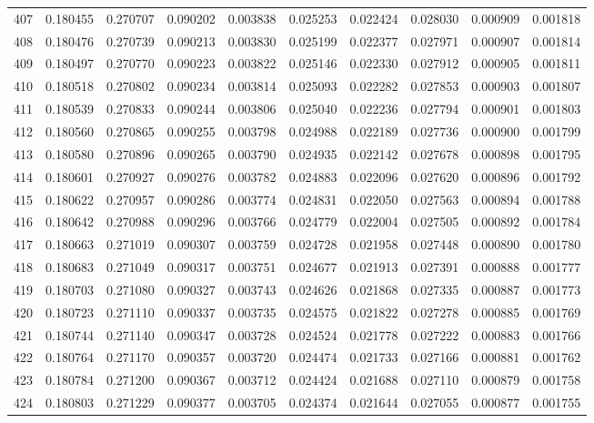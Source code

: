 \begin{tabular}{lrrrrrrrrr}
407 & 0.180455 & 0.270707 & 0.090202 & 0.003838 & 0.025253 & 0.022424 & 0.028030 & 0.000909 & 0.001818 \\
408 & 0.180476 & 0.270739 & 0.090213 & 0.003830 & 0.025199 & 0.022377 & 0.027971 & 0.000907 & 0.001814 \\
409 & 0.180497 & 0.270770 & 0.090223 & 0.003822 & 0.025146 & 0.022330 & 0.027912 & 0.000905 & 0.001811 \\
410 & 0.180518 & 0.270802 & 0.090234 & 0.003814 & 0.025093 & 0.022282 & 0.027853 & 0.000903 & 0.001807 \\
411 & 0.180539 & 0.270833 & 0.090244 & 0.003806 & 0.025040 & 0.022236 & 0.027794 & 0.000901 & 0.001803 \\
412 & 0.180560 & 0.270865 & 0.090255 & 0.003798 & 0.024988 & 0.022189 & 0.027736 & 0.000900 & 0.001799 \\
413 & 0.180580 & 0.270896 & 0.090265 & 0.003790 & 0.024935 & 0.022142 & 0.027678 & 0.000898 & 0.001795 \\
414 & 0.180601 & 0.270927 & 0.090276 & 0.003782 & 0.024883 & 0.022096 & 0.027620 & 0.000896 & 0.001792 \\
415 & 0.180622 & 0.270957 & 0.090286 & 0.003774 & 0.024831 & 0.022050 & 0.027563 & 0.000894 & 0.001788 \\
416 & 0.180642 & 0.270988 & 0.090296 & 0.003766 & 0.024779 & 0.022004 & 0.027505 & 0.000892 & 0.001784 \\
417 & 0.180663 & 0.271019 & 0.090307 & 0.003759 & 0.024728 & 0.021958 & 0.027448 & 0.000890 & 0.001780 \\
418 & 0.180683 & 0.271049 & 0.090317 & 0.003751 & 0.024677 & 0.021913 & 0.027391 & 0.000888 & 0.001777 \\
419 & 0.180703 & 0.271080 & 0.090327 & 0.003743 & 0.024626 & 0.021868 & 0.027335 & 0.000887 & 0.001773 \\
420 & 0.180723 & 0.271110 & 0.090337 & 0.003735 & 0.024575 & 0.021822 & 0.027278 & 0.000885 & 0.001769 \\
421 & 0.180744 & 0.271140 & 0.090347 & 0.003728 & 0.024524 & 0.021778 & 0.027222 & 0.000883 & 0.001766 \\
422 & 0.180764 & 0.271170 & 0.090357 & 0.003720 & 0.024474 & 0.021733 & 0.027166 & 0.000881 & 0.001762 \\
423 & 0.180784 & 0.271200 & 0.090367 & 0.003712 & 0.024424 & 0.021688 & 0.027110 & 0.000879 & 0.001758 \\
424 & 0.180803 & 0.271229 & 0.090377 & 0.003705 & 0.024374 & 0.021644 & 0.027055 & 0.000877 & 0.001755 \\

\end{tabular}
